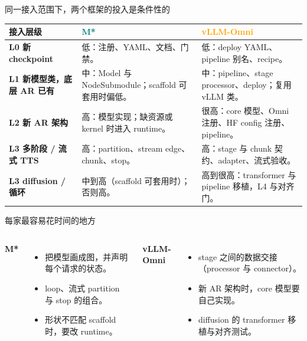 \begin{frame}[t]{同一接入范围下，两个框架的投入是条件性的}
\scriptsize\def\codesize{\relax}
\renewcommand{\arraystretch}{1.14}
\setlength{\tabcolsep}{2.8pt}
\begin{tabularx}{\textwidth}{>{\bfseries}p{2.0cm} Y Y}
\toprule
{}
接入层级 & \textcolor{Teal}{M*} & \textcolor{Orange}{vLLM-Omni} \\
\midrule
L0 新 checkpoint & 低：注册、YAML、文档、门禁。 & 低：deploy YAML、pipeline 别名、recipe。 \\
L1 新模型类，底层 AR 已有 & 中：Model 与 NodeSubmodule；scaffold 可套用时偏低。 & 中：pipeline、stage processor、deploy；复用 vLLM 类。 \\
L2 新 AR 架构 & 高：模型实现；缺资源或 kernel 时进入 runtime。 & 很高：core 模型、Omni 注册、HF config 注册、pipeline。 \\
L3 多阶段 / 流式 TTS & 高：partition、stream edge、chunk、stop。 & 高：stage 与 chunk 契约、adapter、流式验收。 \\
L3 diffusion / 循环 & 中到高（scaffold 可套用时）；否则高。 & 高到很高：transformer 与 pipeline 移植，L4 与对齐门。 \\
\bottomrule
\end{tabularx}
\vspace{2pt}
\end{frame}

\begin{frame}[t]{每家最容易花时间的地方}
\small
\begin{columns}[T,onlytextwidth]
  \textbf{M*}
  \begin{itemize}
    \item 把模型画成图，并声明每个请求的状态。
    \item loop、流式 partition 与 stop 的组合。
    \item 形状不匹配 scaffold 时，要改 runtime。
  \end{itemize}
  \textbf{vLLM-Omni}
  \begin{itemize}
    \item stage 之间的数据交接（processor 与 connector）。
    \item 新 AR 架构时，core 模型要自己实现。
    \item diffusion 的 transformer 移植与对齐测试。
  \end{itemize}
\end{columns}
\end{frame}

